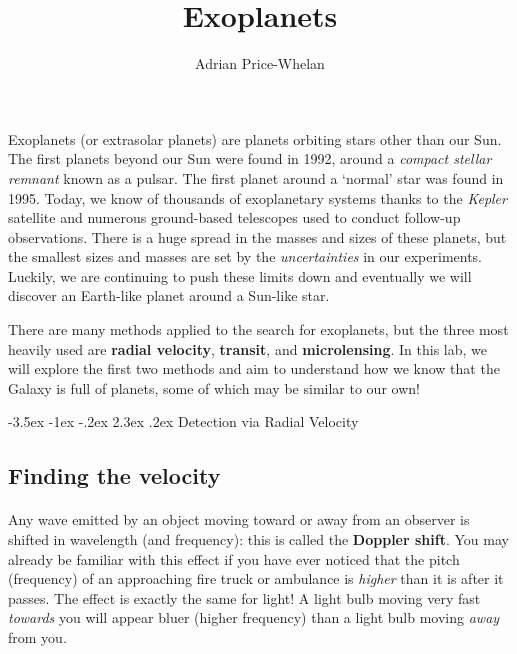 \documentclass[12pt]{article}
\makeatletter
\renewcommand\section{\@startsection{section}{1}{\z@}%
                                  {-3.5ex \@plus -1ex \@minus -.2ex}%
                                  {2.3ex \@plus.2ex}%
                                  {\normalfont\large\bfseries}}
\makeatother
\begin{document}
\title{Exoplanets}
\author{Adrian Price-Whelan}
\date{}%

\maketitle

\paragraph{}
Exoplanets (or extrasolar planets) are planets orbiting stars other than our Sun. The first planets beyond our Sun were found in 1992, around
a \textit{compact stellar remnant} known as a pulsar. The first planet around a `normal' star was found in 1995. Today, we know of thousands
of exoplanetary systems thanks to the \textit{Kepler} satellite and numerous ground-based telescopes used to conduct follow-up observations.
There is a huge spread in the masses and sizes of these planets, but the smallest sizes and masses are set by the \textit{uncertainties} in our 
experiments. Luckily, we are continuing to push these limits down and eventually we will discover an Earth-like planet around a Sun-like star.

There are many methods applied to the search for exoplanets, but the three most heavily used are \textbf{radial velocity}, \textbf{transit}, and \textbf{microlensing}. In this lab, we will explore the first two methods and aim to understand how we know that the Galaxy is full of planets, some of which may be similar to our own!


\section{Detection via Radial Velocity}

\subsection{Finding the velocity}
\paragraph{}
Any wave emitted by an object moving toward or away from an observer is shifted in wavelength (and frequency): this is called the \textbf{Doppler shift}. You may already be familiar with this effect if you have ever noticed that the pitch (frequency) of an approaching fire truck or ambulance is \textit{higher} than it is after it passes. The effect is exactly the same for light! A light bulb moving very fast \textit{towards} you will appear bluer (higher frequency) than a light bulb moving \textit{away} from you. 
\end{document}

